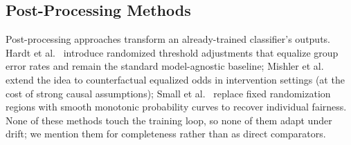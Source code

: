 \documentclass[conference]{IEEEtran}
\begin{document}
\subsection{Post-Processing Methods}
Post-processing approaches transform an already-trained classifier's outputs. Hardt et al.~\cite{NIPS2016_6a9659fe} introduce randomized threshold adjustments
that equalize group error rates and remain the standard model-agnostic baseline; Mishler et al.~\cite{Mishler_2021} extend the idea to counterfactual equalized
odds in intervention settings (at the cost of strong causal assumptions); Small et al.~\cite{Small_2024} replace fixed randomization regions with smooth monotonic
probability curves to recover individual fairness. None of these methods touch the training loop, so none of them adapt under drift; we mention them for
completeness rather than as direct comparators.
\end{document}

